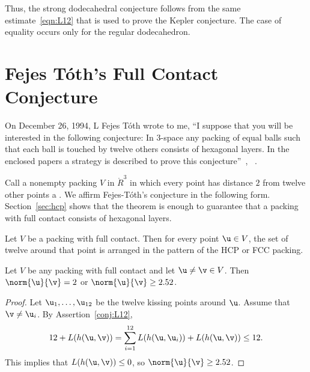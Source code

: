 Thus, the strong dodecahedral conjecture follows from the same
estimate~\eqref{eqn:L12} that is used to prove the Kepler conjecture.
The case of equality occurs only for the regular dodecahedron.

\newpage
\section{Fejes T\'oth's Full Contact Conjecture}


On December 26, 1994, L Fejes T\'oth wrote to me, ``I suppose that you will
be interested in the following conjecture: In $3$-space any packing of
equal balls such that each ball is touched by twelve others consists
of hexagonal layers.  In the enclosed papers a strategy is described
to prove this conjecture''~\cite{Fejes-Toth:89},
~\cite{Fejes-Toth:69}.

Call a nonempty packing $V$ in $\ring{R}^3$ in which every point has
distance  $2$ from twelve other points a .   We affirm Fejes-T\'oth's conjecture in the following form.  Section~\ref{sec:hcp} shows that the theorem is enough to guarantee that a packing with full
contact consists
of hexagonal layers.
%
%
%


\begin{theorem}\label{thm:fc} 
  Let $V$ be a packing with full contact.  Then for every point $\u\in
  V$, the set of twelve around that point is arranged in the pattern
  of the HCP or FCC packing.
\end{theorem}
%
%
%



\begin{lemma}[] \label{lemma:gap}
  Let $V$ be any packing with full contact and let $\u\ne\v\in V$.
  Then $\norm{\u}{\v}=2$ or $\norm{\u}{\v} \ge 2.52$.
\end{lemma}
%
%

\begin{proof} Let $ \u_1,\ldots, \u_{12}$ be the twelve kissing points
  around $\u$.  Assume that $\v\ne \u_i$.  By
  Assertion~\ref{conj:L12},
\[
  12 + L(h( \u, \v)) 
  = \sum_{i=1}^{12} L(h( \u, \u_i)) + L(h( \u, \v)) \le 12.
\]
This implies that $L(h( \u, \v))\le 0$, so $\norm{ \u}{ \v}\ge 2.52$.
\end{proof}

